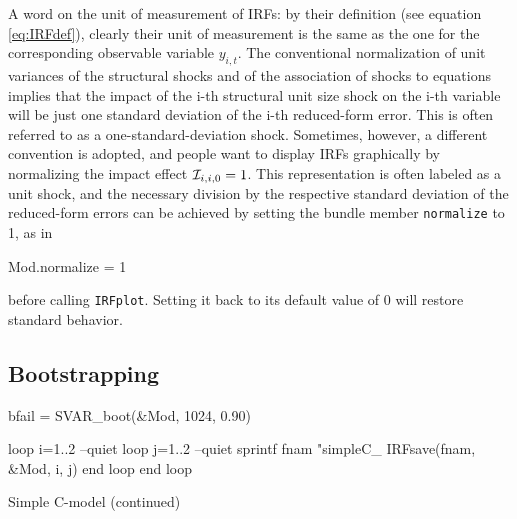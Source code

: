 \documentclass[a4paper,10pt]{article}
\newcommand{\cmd}[1]{\texttt{#1}}
\newcommand{\IRF}[1]{\ensuremath \mathcal{I}_{#1}}
\begin{document}
A word on the unit of measurement of IRFs: by their definition (see
equation \eqref{eq:IRFdef}), clearly their unit of measurement is
the same as the one for the corresponding observable variable
$y_{i,t}$. 
The conventional normalization of unit variances of the structural shocks 
and of the association of shocks to equations implies that the impact of the 
i-th structural unit size shock on the i-th variable will be just one standard 
deviation of the i-th reduced-form error. 
This is often referred to as a one-standard-deviation shock.
Sometimes, however, a different convention is adopted, and
people want to display IRFs graphically by normalizing the impact 
effect $\IRF{i,i,0} = 1$.
This representation is often labeled as a unit shock, and the necessary division 
by the respective standard deviation of the reduced-form errors 
can be achieved by setting the bundle member \cmd{normalize}
to 1, as in
\begin{code}
  Mod.normalize = 1
\end{code}
before calling \cmd{IRFplot}. Setting it back to its default value of
0 will restore standard behavior.

\subsection{Bootstrapping}
\label{sec:bootstrap}

\begin{table}[htbp]
\begin{scode}
  bfail = SVAR_boot(&Mod, 1024, 0.90)

  loop i=1..2 --quiet
      loop j=1..2 --quiet
          sprintf fnam "simpleC_%
          IRFsave(fnam, &Mod, i, j)
      end loop
  end loop
  \end{scode}
  \caption{Simple C-model (continued)}
  \label{tab:simpleC-IRF}
\end{table}
\end{document}
